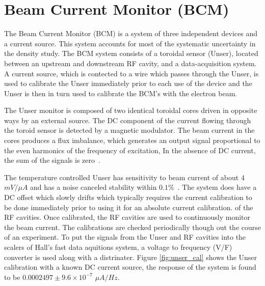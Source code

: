 \documentclass[final,5p,times,twocolumn]{elsarticle}
\begin{document}
\section{Beam Current Monitor (BCM)}
\label{BCM}

The Beam Current Monitor (BCM) is a system of three independent devices and a current source. This system accounts for most  
of the systematic uncertainty in the density study.  The BCM system consists of a toroidal sensor (Unser), located between 
an upstream and downstream RF cavity, and a data-acquisition system.  A current source, which is contected to a wire which 
passes through the Unser, is used to calibrate the Unser immediately prior to each use of the device and
the Unser is then in turn used to calibrate the BCM's with the electron beam. 

The Unser monitor is composed of two identical toroidal cores driven in opposite ways by an external source.  
The DC component of the current flowing through the toroid sensor is detected by a magnetic modulator. The 
beam current in the cores produces a flux imbalance, which generates an output signal proportional to the 
even harmonics of the frequency of excitation, In the absence of DC current, the sum of the signals is zero~\cite{denard}. 

The temperature controlled Unser has sensitivity to beam current of about $4$ $mV/\mu A$ and has a noise canceled 
stability within $0.1\%$~\cite{denard}.  The system does have a DC offset which slowly drifts which typically 
requires the current calibration to be done immediately prior to using it for an absolute current calibration.
of the RF cavities.  Once calibrated, the RF cavities are used to continuously monitor the beam current. 
The calibrations are checked periodically though out the course of an experiment. 
To put the signals from the Unser and RF cavities into the scalers of Hall's fast data aquitions system,
a voltage to frequency (V/F) converter is used along with a distrinater. 
Figure \ref{fig:unser_cal} shows the Unser calibration with a known DC current source, 
the response of the system is found to be $0.0002497 \pm 9.6 \times 10^{-7} $ $\mu A/Hz$. 
\end{document}

